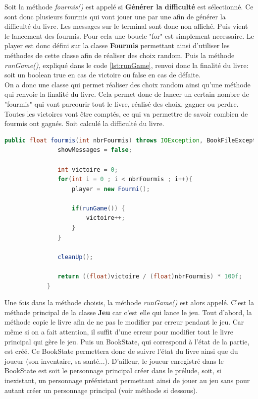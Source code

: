 		Soit la méthode \textit{fourmis()} est appelé si \textbf{Générer la difficulté} est sélectionné. Ce sont donc plusieurs fourmis qui vont jouer une par une afin de générer la difficulté du livre. Les messages sur le terminal sont donc non affiché. Puis vient le lancement des fourmis. Pour cela une boucle "for" est simplement necessaire. Le player est donc défini sur la classe \textbf{Fourmis} permettant ainsi d'utiliser les méthodes de cette classe afin de réaliser des choix random. Puis la méthode \textit{runGame()}, expliqué dans le code \ref{lst:runGame}, renvoi donc la finalité du livre: soit un boolean true en cas de victoire ou false en cas de défaite.\\
		On a donc une classe qui permet réaliser des choix random ainsi qu'une méthode qui renvoie la finalité du livre. Cela permet donc de lancer un certain nombre de "fourmis" qui vont parcourir tout le livre, réalisé des choix, gagner ou perdre. Toutes les victoires vont être comptés, ce qui va permettre de savoir combien de fourmis ont gagnés. Soit calculé la difficulté du livre.

		\begin{lstlisting}[language=java, caption=fourmis()]
			public float fourmis(int nbrFourmis) throws IOException, BookFileException {
			   showMessages = false;

			   int victoire = 0;
			   for(int i = 0 ; i < nbrFourmis ; i++){
				   player = new Fourmi();

				   if(runGame()) {
					   victoire++;
				   }
			   }

			   cleanUp();

			   return ((float)victoire / (float)nbrFourmis) * 100f;
			}
		\end{lstlisting}


		Une fois dans la méthode choisis, la méthode \textit{runGame()} est alors appelé. C'est la méthode principal de la classe \textbf{Jeu} car c'est elle qui lance le jeu.
		Tout d'abord, la méthode copie le livre afin de ne pas le modifier par erreur pendant le jeu. Car même si on a fait attention, il suffit d'une erreur pour modifier tout le livre principal qui gère le jeu. Puis un BookState, qui correspond à l'état de la partie, est créé. Ce BookState permettera donc de suivre l'état du livre ainsi que du joueur (son inventaire, sa santé...). D'ailleur, le joueur enregistré dans le BookState est soit le personnage principal créer dans le prélude, soit, si inexistant, un personnage prééxistant permettant ainsi de jouer au jeu sans pour autant créer un personnage principal (voir méthode si dessous).

